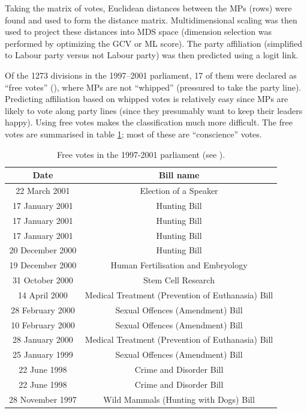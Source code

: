 Taking the matrix of votes, Euclidean distances between the MPs (rows) were found and used to form the distance matrix. Multidimensional scaling was then used to project these distances into MDS space (dimension selection was performed by optimizing the GCV or ML score). The party affiliation (simplified to Labour party versus not Labour party) was then predicted using a logit link.

Of the 1273 divisions in the 1997--2001 parliament, 17 of them were declared  as ``free votes'' (\cite{freevotes}), where MPs are not ``whipped'' (pressured to take the party line). Predicting affiliation based on whipped votes is relatively easy since MPs are likely to vote along party lines (since they presumably want to keep their leaders happy). Using free votes makes the classification much more difficult. The free votes are summarised in table \ref{free-vote-description}; most of these are ``conscience'' votes.

\begin{table}  
\begin{centering}
\begin{tabular}{cc}
	Date & Bill name \\
    \hline
22 March 2001    &   Election of a Speaker \\
17 January 2001  &   Hunting Bill \\
17 January 2001  &   Hunting Bill \\
17 January 2001  &   Hunting Bill\\
20 December 2000 &   Hunting Bill \\
19 December 2000 &   Human Fertilisation and Embryology\\
31 October 2000  &   Stem Cell Research \\
14 April 2000    &   Medical Treatment (Prevention of Euthanasia) Bill \\
28 February 2000 &   Sexual Offences (Amendment) Bill \\
10 February 2000 &   Sexual Offences (Amendment) Bill \\
28 January 2000  &   Medical Treatment (Prevention of Euthanasia) Bill\\
25 January 1999  &   Sexual Offences (Amendment) Bill\\
22 June 1998     &  Crime and Disorder Bill \\
22 June 1998     &  Crime and Disorder Bill \\
28 November 1997 &  Wild Mammals (Hunting with Dogs) Bill\\
  \end{tabular}
\caption{Free votes in the 1997-2001 parliament (see \cite{freevotes}).}
\end{centering}
\label{free-vote-description}
\end{table}

